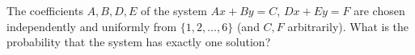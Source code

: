 The coefficients $A,B,D,E$ of the system $Ax+By=C$, $Dx+Ey=F$ are chosen independently and uniformly from $\{1,2,\dots,6\}$ (and $C,F$ arbitrarily). What is the probability that the system has exactly one solution?
